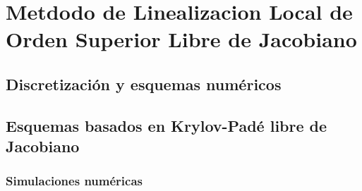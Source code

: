 \chapter{Metdodo de Linealizacion Local de Orden Superior Libre de Jacobiano}\label{chapter:llrk-fj}

\section{Discretización y esquemas numéricos}

\section{Esquemas basados en Krylov-Padé libre de Jacobiano}

\subsection{Simulaciones numéricas}